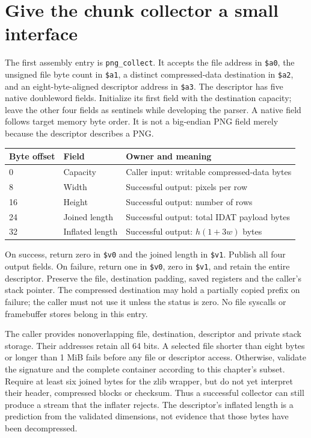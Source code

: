 \section{Give the chunk collector a small interface}
The first assembly entry is \texttt{png\_collect}. It accepts the file address in
\texttt{\$a0}, the unsigned file byte count in \texttt{\$a1}, a distinct compressed-data
destination in \texttt{\$a2}, and an eight-byte-aligned descriptor address in
\texttt{\$a3}. The descriptor has five native doubleword fields. Initialize its first
field with the destination capacity; leave the other four fields as sentinels while
developing the parser. A native field follows target memory byte order. It is not a
big-endian PNG field merely because the descriptor describes a PNG.

\begin{longtable}{p{22mm}p{35mm}p{93mm}}
  \toprule Byte offset & Field           & Owner and meaning                            \\\midrule
  0                    & Capacity        & Caller input: writable compressed-data bytes \\
  8                    & Width           & Successful output: pixels per row            \\
  16                   & Height          & Successful output: number of rows            \\
  24                   & Joined length   & Successful output: total IDAT payload bytes  \\
  32                   & Inflated length & Successful output: $h(1+3w)$ bytes           \\\bottomrule
\end{longtable}
On success, return zero in \texttt{\$v0} and the joined length in \texttt{\$v1}.
Publish all four output fields. On failure, return one in \texttt{\$v0}, zero in
\texttt{\$v1}, and retain the entire descriptor. Preserve the file, destination
padding, saved registers and the caller's stack pointer. The compressed destination
may hold a partially copied prefix on failure; the caller must not use it unless the
status is zero. No file syscalls or framebuffer stores belong in this entry.

The caller provides nonoverlapping file, destination, descriptor and private stack
storage. Their addresses retain all 64 bits. A selected file shorter than eight bytes
or longer than 1 MiB fails before any file or descriptor access. Otherwise, validate
the signature and the complete container according to this chapter's subset. Require
at least six joined bytes for the zlib wrapper, but do not yet interpret their header,
compressed blocks or checksum. Thus a successful collector can still produce a stream
that the inflater rejects. The descriptor's inflated length is a prediction from the
validated dimensions, not evidence that those bytes have been decompressed.


